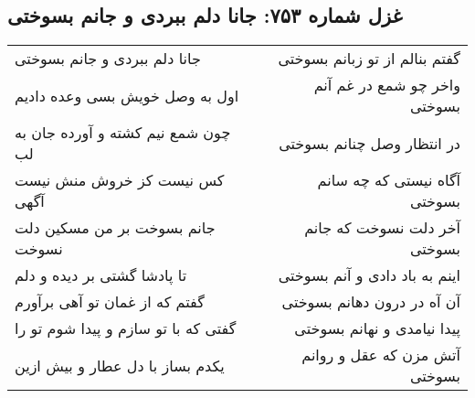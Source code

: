 \begin{center}
\section*{غزل شماره ۷۵۳: جانا دلم ببردی و جانم بسوختی}
\label{sec:753}
\begin{longtable}{l p{0.5cm} r}
جانا دلم ببردی و جانم بسوختی
&&
گفتم بنالم از تو زبانم بسوختی
\\
اول به وصل خویش بسی وعده دادیم
&&
واخر چو شمع در غم آنم بسوختی
\\
چون شمع نیم کشته و آورده جان به لب
&&
در انتظار وصل چنانم بسوختی
\\
کس نیست کز خروش منش نیست آگهی
&&
آگاه نیستی که چه سانم بسوختی
\\
جانم بسوخت بر من مسکین دلت نسوخت
&&
آخر دلت نسوخت که جانم بسوختی
\\
تا پادشا گشتی بر دیده و دلم
&&
اینم به باد دادی و آنم بسوختی
\\
گفتم که از غمان تو آهی برآورم
&&
آن آه در درون دهانم بسوختی
\\
گفتی که با تو سازم و پیدا شوم تو را
&&
پیدا نیامدی و نهانم بسوختی
\\
یکدم بساز با دل عطار و بیش ازین
&&
آتش مزن که عقل و روانم بسوختی
\\
\end{longtable}
\end{center}
